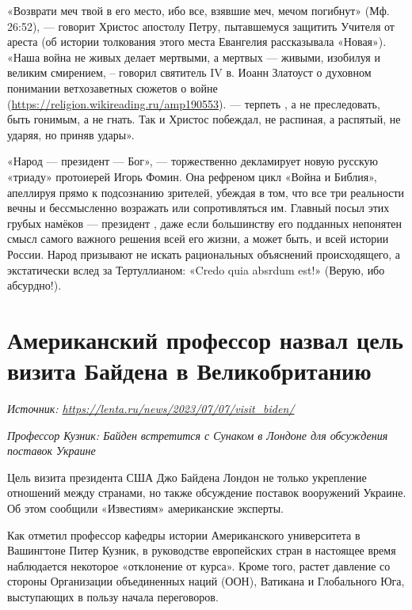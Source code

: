 «Возврати меч твой в его место, ибо все, взявшие меч, мечом погибнут» (Мф. 26:52), — говорит Христос апостолу Петру, пытавшемуся защитить Учителя от ареста (об истории толкования этого места Евангелия рассказывала «Новая»). «Наша война не живых делает мертвыми, а мертвых — живыми, изобилуя  и великим смирением, -- говорил святитель IV в. Иоанн Златоуст о духовном понимании ветхозаветных сюжетов о войне (\url{https://religion.wikireading.ru/amp190553}). —  терпеть , а не преследовать, быть гонимым, а не гнать. Так и Христос побеждал, не распиная, а распятый, не ударяя, но приняв удары».

«Народ — президент — Бог», --- торжественно декламирует новую русскую «триаду» протоиерей Игорь Фомин. Она рефреном  цикл «Война и Библия», апеллируя прямо к подсознанию зрителей, убеждая в том, что все три реальности вечны и бессмысленно возражать или сопротивляться им. Главный посыл этих грубых намёков --- президент , даже если большинству его подданных непонятен смысл самого важного решения всей его жизни, а может быть, и всей истории России. Народ призывают не искать рациональных объяснений происходящего, а экстатически  вслед за Тертуллианом: «Credo quia absrdum est!» (Верую, ибо абсурдно!).


\newpage
\section{Американский профессор назвал цель визита Байдена в Великобританию}

\textit{Источник: \url{https://lenta.ru/news/2023/07/07/visit_biden/}}

\textit{Профессор Кузник: Байден встретится с Сунаком в Лондоне для обсуждения поставок Украине}

Цель визита президента США Джо Байдена Лондон не только укрепление отношений между странами, но также обсуждение поставок вооружений Украине. Об этом сообщили «Известиям» американские эксперты.

Как отметил профессор кафедры истории Американского университета в Вашингтоне Питер Кузник, в руководстве европейских стран в настоящее время наблюдается некоторое «отклонение от курса». Кроме того, растет давление со стороны Организации объединенных наций (ООН), Ватикана и Глобального Юга, выступающих в пользу начала переговоров.

